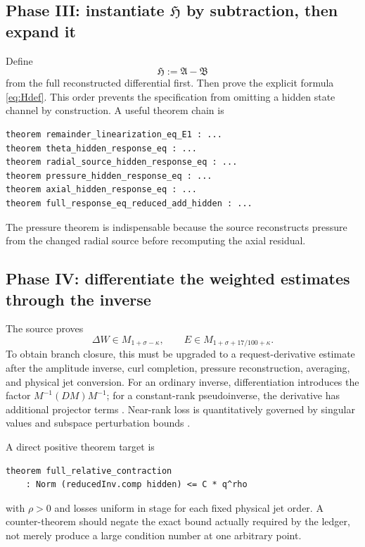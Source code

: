 \documentclass[12pt]{article}
\theoremstyle{plain}
\theoremstyle{definition}
\theoremstyle{remark}
\newcommand{\Comp}{\mathfrak A}
\newcommand{\Red}{\mathfrak B}
\newcommand{\Hidden}{\mathfrak H}
\begin{document}
\subsection{Phase III: instantiate \texorpdfstring{\(\Hidden\)}{the hidden operator} by subtraction, then expand it}
Define
\[
\Hidden:=\Comp-\Red
\]
from the full reconstructed differential first. Then prove the explicit formula \eqref{eq:Hdef}. This order prevents the specification from omitting a hidden state channel by construction. A useful theorem chain is
\begin{lstlisting}
theorem remainder_linearization_eq_E1 : ...
theorem theta_hidden_response_eq : ...
theorem radial_source_hidden_response_eq : ...
theorem pressure_hidden_response_eq : ...
theorem axial_hidden_response_eq : ...
theorem full_response_eq_reduced_add_hidden : ...
\end{lstlisting}
The pressure theorem is indispensable because the source reconstructs pressure from the changed radial source before recomputing the axial residual.

\subsection{Phase IV: differentiate the weighted estimates through the inverse}
The source proves
\[
\Delta W\in M_{1+\sigma-\kappa},
\qquad
E\in M_{1+\sigma+17/100+\kappa}.
\]
To obtain branch closure, this must be upgraded to a request-derivative estimate after the amplitude inverse, curl completion, pressure reconstruction, averaging, and physical jet conversion. For an ordinary inverse, differentiation introduces the factor \(M^{-1}(DM)M^{-1}\); for a constant-rank pseudoinverse, the derivative has additional projector terms \cite{GolubPereyra1973}. Near-rank loss is quantitatively governed by singular values and subspace perturbation bounds \cite{Wedin1972,StewartSun1990}.

A direct positive theorem target is
\begin{lstlisting}
theorem full_relative_contraction
    : Norm (reducedInv.comp hidden) <= C * q^rho
\end{lstlisting}
with \(\rho>0\) and losses uniform in stage for each fixed physical jet order. A counter-theorem should negate the exact bound actually required by the ledger, not merely produce a large condition number at one arbitrary point.
\end{document}
